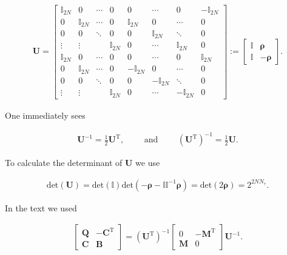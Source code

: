 \documentclass{article}
\begin{document}
\begin{align}
	\boldsymbol{U}  = \left[
		\begin{array}{cccc|cccc}
			\mathbb{I}_{2N} & 0 & \cdots & 0 & 0 & \cdots & 0 & -\mathbb{I}_{2N} \\
			0 & \mathbb{I}_{2N} & \cdots & 0 & \mathbb{I}_{2N} & 0 & \cdots & 0 \\
			0 & 0 & \ddots & 0 & 0 & \mathbb{I}_{2N} & \ddots & 0 \\
			\vdots & \vdots & & \mathbb{I}_{2N} & 0 & \cdots & \mathbb{I}_{2N} & 0 \\
			\hline
			\mathbb{I}_{2N} & 0 & \cdots & 0 & 0 & \cdots & 0 & \mathbb{I}_{2N} \\
			0 & \mathbb{I}_{2N} & \cdots & 0 & -\mathbb{I}_{2N} & 0 & \cdots & 0 \\
			0 & 0 & \ddots & 0 & 0 & -\mathbb{I}_{2N} & \ddots & 0 \\
			\vdots & \vdots & & \mathbb{I}_{2N} & 0 & \cdots & -\mathbb{I}_{2N} & 0
		\end{array}
	\right]:= \begin{bmatrix}
		\mathbb{I} & \boldsymbol{\rho}  \\
		\mathbb{I} & -\boldsymbol{\rho} 
	\end{bmatrix}.
\end{align}

One immediately sees

\begin{align}
	\boldsymbol{U} ^{-1} = \frac{1}{2} \boldsymbol{U} ^{\mathrm{T}  },\quad\quad\text{ and }\quad\quad  \left(\boldsymbol{U}^{\mathrm{T}  }\right)^{-1}= \frac{1}{2}\boldsymbol{U}  .
\end{align}


To calculate the determinant of $\boldsymbol{U}$ we use

\begin{align}
	\mathrm{det} \left(\boldsymbol{U} \right) = \mathrm{det} \left(\mathbb{I}\right)\mathrm{det} \left(-\boldsymbol{\rho} - \mathbb{I} \mathbb{I}^{-1}\boldsymbol{\rho}\right)=\mathrm{det} \left(2\boldsymbol{\rho}\right) = 2^{2NN_\tau} .
\end{align}

In the text we used

\begin{align}
	\begin{bmatrix}
		\boldsymbol{Q}&-\boldsymbol{C}^{\mathrm{T}  }\\
		\boldsymbol{C}& \boldsymbol{B} 
	\end{bmatrix} = 
	\left(\boldsymbol{U}^{\mathrm{T}  } \right)^{-1}\begin{bmatrix}
		0 & -\boldsymbol{M}^{\mathrm{T}  }\\
		\boldsymbol{M}& 0 
	\end{bmatrix}
	\boldsymbol{U}^{-1}.
\end{align}
\end{document}
